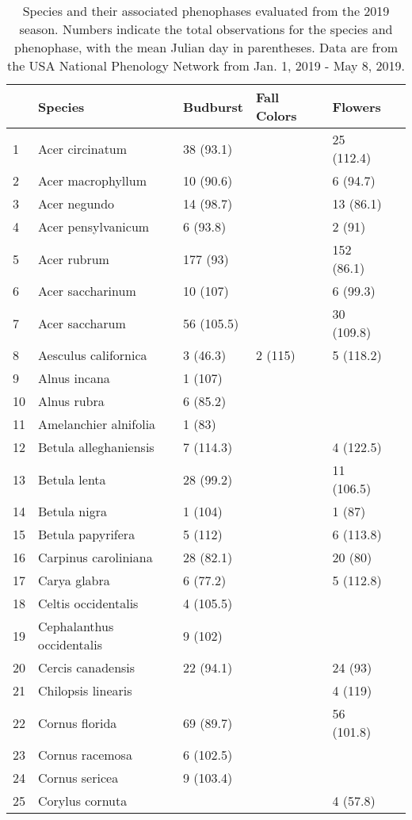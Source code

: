 \newpage

\begin{table}
    \caption[Species and their associated phenophases evaluated from the 2019 season]{Species and their associated phenophases evaluated from the 2019 season. Numbers indicate the total observations for the species and phenophase, with the mean Julian day in parentheses. Data are from the USA National Phenology Network from Jan. 1, 2019 - May 8, 2019.}
    \label{table-c-2}
\begin{tabularx}{\textwidth}{p{0.5cm}XXXXX}
\hline
 & Species & Budburst & Fall Colors & Flowers \\ 
\hline

1 & Acer circinatum & 38 (93.1) &  & 25 (112.4) \\ 
2 & Acer macrophyllum & 10 (90.6) &  & 6 (94.7) \\ 
3 & Acer negundo & 14 (98.7) &  & 13 (86.1) \\ 
4 & Acer pensylvanicum & 6 (93.8) &  & 2 (91) \\ 
5 & Acer rubrum & 177 (93) &  & 152 (86.1) \\ 
6 & Acer saccharinum & 10 (107) &  & 6 (99.3) \\ 
7 & Acer saccharum & 56 (105.5) &  & 30 (109.8) \\ 
8 & Aesculus californica & 3 (46.3) & 2 (115) & 5 (118.2) \\ 
9 & Alnus incana & 1 (107) &  &  \\ 
10 & Alnus rubra & 6 (85.2) &  &  \\ 
11 & Amelanchier alnifolia & 1 (83) &  &  \\ 
12 & Betula alleghaniensis & 7 (114.3) &  & 4 (122.5) \\ 
13 & Betula lenta & 28 (99.2) &  & 11 (106.5) \\ 
14 & Betula nigra & 1 (104) &  & 1 (87) \\ 
15 & Betula papyrifera & 5 (112) &  & 6 (113.8) \\ 
16 & Carpinus caroliniana & 28 (82.1) &  & 20 (80) \\ 
17 & Carya glabra & 6 (77.2) &  & 5 (112.8) \\ 
18 & Celtis occidentalis & 4 (105.5) &  &  \\ 
19 & Cephalanthus occidentalis & 9 (102) &  &  \\ 
20 & Cercis canadensis & 22 (94.1) &  & 24 (93) \\ 
21 & Chilopsis linearis &  &  & 4 (119) \\ 
22 & Cornus florida & 69 (89.7) &  & 56 (101.8) \\ 
23 & Cornus racemosa & 6 (102.5) &  &  \\ 
24 & Cornus sericea & 9 (103.4) &  &  \\ 
25 & Corylus cornuta &  &  & 4 (57.8) \\ 

\hline
\end{tabularx}
\end{table}


